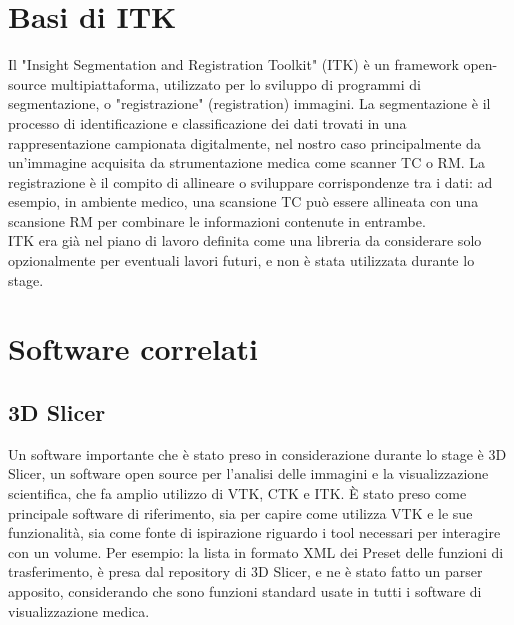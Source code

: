 \section{Basi di ITK}

Il "Insight Segmentation and Registration Toolkit" (ITK) è un framework open-source multipiattaforma, utilizzato per lo sviluppo di programmi di segmentazione, o "registrazione" (registration) immagini. La segmentazione è il processo di identificazione e classificazione dei dati trovati in una rappresentazione campionata digitalmente, nel nostro caso principalmente da un'immagine acquisita da strumentazione medica come scanner TC o RM. La registrazione è il compito di allineare o sviluppare corrispondenze tra i dati: ad esempio, in ambiente medico, una scansione TC può essere allineata con una scansione RM per combinare le informazioni contenute in entrambe.
\\
ITK era già nel piano di lavoro definita come una libreria da considerare solo opzionalmente per eventuali lavori futuri, e non è stata utilizzata durante lo stage.

\section{Software correlati}
\subsection{3D Slicer}
Un software importante che è stato preso in considerazione durante lo stage è 3D Slicer, un software open source per l'analisi delle immagini e la visualizzazione scientifica, che fa amplio utilizzo di VTK, CTK e ITK. \`E stato preso come principale software di riferimento, sia per capire come utilizza VTK e le sue funzionalità, sia come fonte di ispirazione riguardo i tool necessari per interagire con un volume. Per esempio: la lista in formato XML dei Preset delle funzioni di trasferimento, è presa dal repository di 3D Slicer, e ne è stato fatto un parser apposito, considerando che sono funzioni standard usate in tutti i software di visualizzazione medica.

